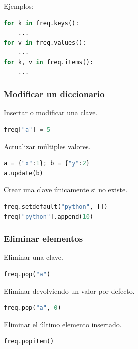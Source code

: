 Ejemplos:

\begin{lstlisting}[language=Python]
for k in freq.keys():
    ...
for v in freq.values():
    ...
for k, v in freq.items():
    ...
\end{lstlisting}

\vspace{0.3cm}

\subsubsection{Modificar un diccionario}

Insertar o modificar una clave.

\begin{lstlisting}[language=Python]
freq["a"] = 5
\end{lstlisting}

Actualizar múltiples valores.

\begin{lstlisting}[language=Python]
a = {"x":1}; b = {"y":2}
a.update(b)
\end{lstlisting}

Crear una clave únicamente si no existe.

\begin{lstlisting}[language=Python]
freq.setdefault("python", [])
freq["python"].append(10)
\end{lstlisting}

\vspace{0.3cm}

\subsubsection{Eliminar elementos}

Eliminar una clave.

\begin{lstlisting}[language=Python]
freq.pop("a")
\end{lstlisting}

Eliminar devolviendo un valor por defecto.

\begin{lstlisting}[language=Python]
freq.pop("a", 0)
\end{lstlisting}

Eliminar el último elemento insertado.

\begin{lstlisting}[language=Python]
freq.popitem()
\end{lstlisting}

